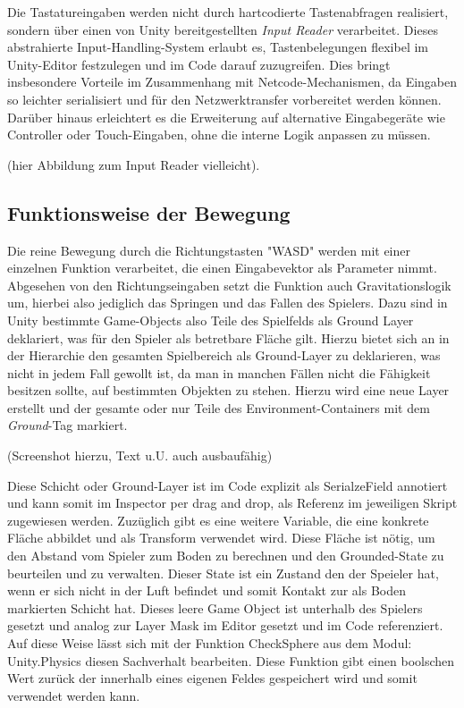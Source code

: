 Die Tastatureingaben werden nicht durch hartcodierte Tastenabfragen realisiert, sondern über einen von Unity bereitgestellten \textit{Input Reader} verarbeitet. Dieses abstrahierte Input-Handling-System erlaubt es, Tastenbelegungen flexibel im Unity-Editor festzulegen und im Code darauf zuzugreifen. Dies bringt insbesondere Vorteile im Zusammenhang mit Netcode-Mechanismen, da Eingaben so leichter serialisiert und für den Netzwerktransfer vorbereitet werden können. Darüber hinaus erleichtert es die Erweiterung auf alternative Eingabegeräte wie Controller oder Touch-Eingaben, ohne die interne Logik anpassen zu müssen.

(hier Abbildung zum Input Reader vielleicht).

\subsection{Funktionsweise der Bewegung}
Die reine Bewegung durch die Richtungstasten "WASD" werden mit einer einzelnen Funktion verarbeitet, die einen Eingabevektor als Parameter nimmt. 
Abgesehen von den Richtungseingaben setzt die Funktion auch Gravitationslogik um, hierbei also jediglich das Springen und das Fallen des Spielers. Dazu sind in Unity bestimmte Game-Objects also Teile des Spielfelds als Ground Layer deklariert, was für den Spieler als betretbare Fläche gilt. 
Hierzu bietet sich an in der Hierarchie den gesamten Spielbereich als Ground-Layer zu deklarieren, was nicht in jedem Fall gewollt ist, da man in manchen Fällen nicht die Fähigkeit besitzen sollte, auf bestimmten Objekten zu stehen. Hierzu wird eine neue Layer erstellt und der gesamte oder nur Teile des Environment-Containers mit dem \textit{Ground}-Tag markiert.

(Screenshot hierzu, Text u.U. auch ausbaufähig)

Diese Schicht oder Ground-Layer ist im Code explizit als SerialzeField annotiert und kann somit im Inspector per drag and drop, als Referenz im jeweiligen Skript zugewiesen werden. Zuzüglich gibt es eine weitere Variable, die eine konkrete Fläche abbildet und als Transform verwendet wird. Diese Fläche ist nötig, um den Abstand vom Spieler zum Boden zu berechnen und den Grounded-State zu beurteilen und zu verwalten. Dieser State ist ein Zustand den der Speieler hat, wenn er sich nicht in der Luft befindet und somit Kontakt zur als Boden markierten Schicht hat.
Dieses leere Game Object ist unterhalb des Spielers gesetzt und analog zur Layer Mask im Editor gesetzt und im Code referenziert.
Auf diese Weise lässt sich mit der Funktion CheckSphere aus dem Modul: Unity.Physics diesen Sachverhalt bearbeiten. Diese Funktion gibt einen boolschen Wert zurück der innerhalb eines eigenen Feldes gespeichert wird und somit verwendet werden kann.

